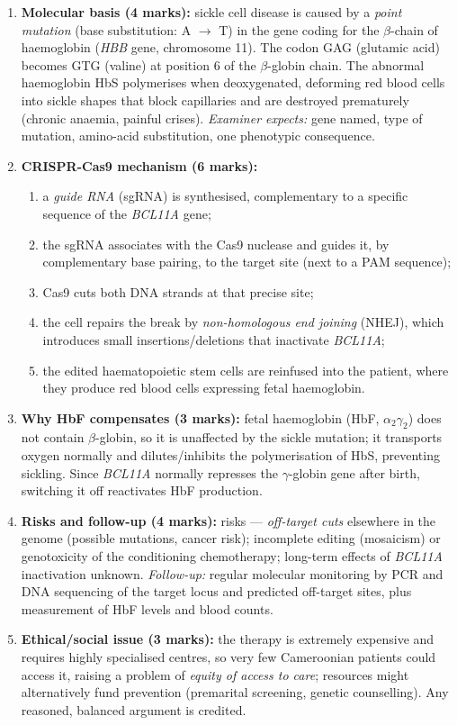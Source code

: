 \documentclass[11pt]{article}
\begin{document}
\begin{corrige}
\begin{enumerate}
\item \textbf{Molecular basis (4 marks):} sickle cell disease is caused by a \emph{point mutation} (base substitution: A $\rightarrow$ T) in the gene coding for the $\beta$-chain of haemoglobin (\emph{HBB} gene, chromosome 11). The codon GAG (glutamic acid) becomes GTG (valine) at position 6 of the $\beta$-globin chain. The abnormal haemoglobin HbS polymerises when deoxygenated, deforming red blood cells into sickle shapes that block capillaries and are destroyed prematurely (chronic anaemia, painful crises). \emph{Examiner expects:} gene named, type of mutation, amino-acid substitution, one phenotypic consequence.
\item \textbf{CRISPR-Cas9 mechanism (6 marks):}
\begin{enumerate}
\item a \emph{guide RNA} (sgRNA) is synthesised, complementary to a specific sequence of the \emph{BCL11A} gene;
\item the sgRNA associates with the Cas9 nuclease and guides it, by complementary base pairing, to the target site (next to a PAM sequence);
\item Cas9 cuts both DNA strands at that precise site;
\item the cell repairs the break by \emph{non-homologous end joining} (NHEJ), which introduces small insertions/deletions that inactivate \emph{BCL11A};
\item the edited haematopoietic stem cells are reinfused into the patient, where they produce red blood cells expressing fetal haemoglobin.
\end{enumerate}
\item \textbf{Why HbF compensates (3 marks):} fetal haemoglobin (HbF, $\alpha_2\gamma_2$) does not contain $\beta$-globin, so it is unaffected by the sickle mutation; it transports oxygen normally and dilutes/inhibits the polymerisation of HbS, preventing sickling. Since \emph{BCL11A} normally represses the $\gamma$-globin gene after birth, switching it off reactivates HbF production.
\item \textbf{Risks and follow-up (4 marks):} risks — \emph{off-target cuts} elsewhere in the genome (possible mutations, cancer risk); incomplete editing (mosaicism) or genotoxicity of the conditioning chemotherapy; long-term effects of \emph{BCL11A} inactivation unknown. \emph{Follow-up:} regular molecular monitoring by PCR and DNA sequencing of the target locus and predicted off-target sites, plus measurement of HbF levels and blood counts.
\item \textbf{Ethical/social issue (3 marks):} the therapy is extremely expensive and requires highly specialised centres, so very few Cameroonian patients could access it, raising a problem of \emph{equity of access to care}; resources might alternatively fund prevention (premarital screening, genetic counselling). Any reasoned, balanced argument is credited.
\end{enumerate}
\end{corrige}
\end{document}
